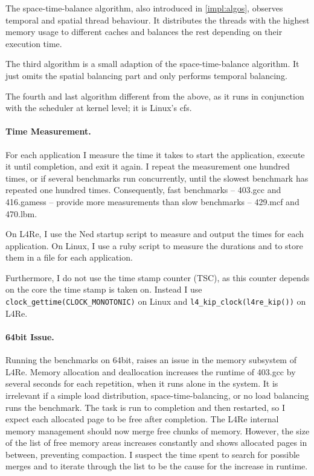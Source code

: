 The space-time-balance algorithm, also introduced in \ref{impl:algos},
observes temporal and spatial thread behaviour.
It distributes the threads with the highest memory usage to different caches
and balances the rest depending on their execution time.

The third algorithm is a small adaption of the space-time-balance algorithm.
It just omits the spatial balancing part and only performs temporal balancing.

The fourth and last algorithm different from the above, as it runs in
conjunction with the scheduler at kernel level; it is Linux's \gls{cfs}.


\paragraph{Time Measurement.}
For each application I measure the time it takes to start the application,
execute it until completion, and exit it again.
I repeat the measurement one hundred times, or if several benchmarks run
concurrently, until the slowest benchmark has repeated one hundred times.
Consequently, fast benchmarks -- 403.gcc and  416.gamess -- provide more
measurements than slow benchmarks -- 429.mcf and 470.lbm.

On L4Re, I use the Ned startup script to measure and output the times for
each application.
On Linux, I use a ruby script to measure the durations and to store them in a
file for each application.

Furthermore, I do not use the time stamp counter (TSC), as this counter depends
on the core the time stamp is taken on.
Instead I use \texttt{clock\_gettime(CLOCK\_MONOTONIC)} on Linux and
\texttt{l4\_kip\_clock(l4re\_kip())} on L4Re.


\paragraph{64bit Issue.}
Running the benchmarks on 64bit, raises an issue in the memory subsystem of L4Re.
Memory allocation and deallocation increases the runtime of 403.gcc by several
seconds for each repetition, when it runs alone in the system.
It is irrelevant if a simple load distribution, space-time-balancing,
or no load balancing runs the benchmark.
The task is run to completion and then restarted, so I expect each allocated
page to be free after completion.
The L4Re internal memory management should now merge free chunks of memory.
However, the size of the list of free memory areas increases constantly and
shows allocated pages in between, preventing compaction.
I suspect the time spent to search for possible merges and to iterate through
the list to be the cause for the increase in runtime.

